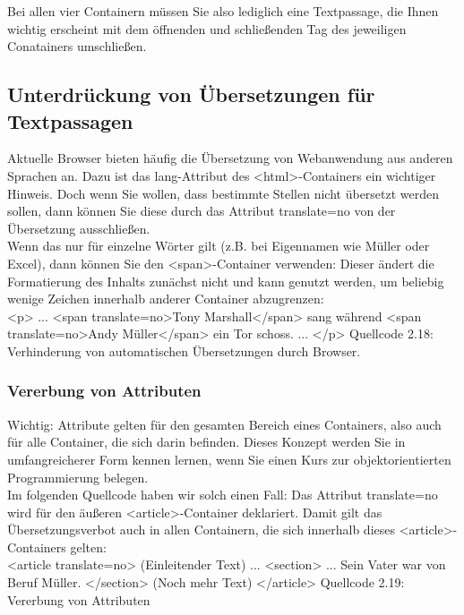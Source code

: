 Bei allen vier Containern müssen Sie also lediglich eine Textpassage, die Ihnen wichtig erscheint mit dem öffnenden und schließenden Tag des jeweiligen Conatainers umschließen.

\subsection{Unterdrückung von Übersetzungen für Textpassagen}

Aktuelle Browser bieten häufig die Übersetzung von Webanwendung aus anderen Sprachen an. Dazu ist das lang-Attribut des <html>-Containers ein wichtiger Hinweis. Doch wenn Sie wollen, dass bestimmte Stellen nicht übersetzt werden sollen, dann können Sie diese durch das Attribut translate=no von der Übersetzung ausschließen.\\

Wenn das nur für einzelne Wörter gilt (z.B. bei Eigennamen wie Müller oder Excel), dann können Sie den <span>-Container verwenden: Dieser ändert die Formatierung des Inhalts zunächst nicht und kann genutzt werden, um beliebig wenige Zeichen innerhalb anderer Container abzugrenzen:\\

<p> 
... 
<span translate=no>Tony Marshall</span> sang während 
<span translate=no>Andy Müller</span> ein Tor schoss. 
...
</p>
Quellcode 2.18: Verhinderung von automatischen Übersetzungen durch Browser.

\subsubsection{Vererbung von Attributen}

Wichtig: Attribute gelten für den gesamten Bereich eines Containers, also auch für alle Container, die sich darin befinden. Dieses Konzept werden Sie in umfangreicherer Form kennen lernen, wenn Sie einen Kurs zur objektorientierten Programmierung belegen.\\

Im folgenden Quellcode haben wir solch einen Fall: Das Attribut translate=no wird für den äußeren <article>-Container deklariert. Damit gilt das Übersetzungsverbot auch in allen Containern, die sich innerhalb dieses <article>-Containers gelten:\\

<article translate=no>
(Einleitender Text) ...
<section> ... Sein Vater war von Beruf Müller.
</section>
(Noch mehr Text)
</article>
Quellcode 2.19: Vererbung von Attributen

